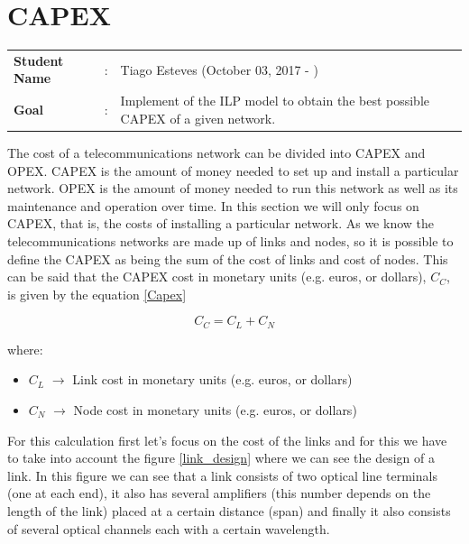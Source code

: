 \clearpage

\section{CAPEX}\label{ILP_CAPEX}
\begin{tcolorbox}	
\begin{tabular}{p{2.75cm} p{0.2cm} p{10.5cm}} 	
\textbf{Student Name}  &:& Tiago Esteves    (October 03, 2017 - )\\
\textbf{Goal}          &:& Implement of the ILP model to obtain the best possible CAPEX of a given network.
\end{tabular}
\end{tcolorbox}
\vspace{11pt}

The cost of a telecommunications network can be divided into CAPEX and OPEX.
CAPEX is the amount of money needed to set up and install a particular network.
OPEX is the amount of money needed to run this network as well as its maintenance and operation over time.
In this section we will only focus on CAPEX, that is, the costs of installing a particular network.
As we know the telecommunications networks are made up of links and nodes, so it is possible to define the CAPEX as being the sum of the cost of links and cost of nodes.
This can be said that the CAPEX cost in monetary units (e.g. euros, or dollars), $C_C$, is given by the equation \ref{Capex}

\begin{equation}
C_C = C_L + C_N
\label{Capex}
\end{equation}

where:
\begin{itemize}
\item{$C_L$				$\rightarrow$	Link cost in monetary units (e.g. euros, or dollars)}
\item{$C_N$				$\rightarrow$	Node cost in monetary units (e.g. euros, or dollars)}
\end{itemize}


\vspace{11pt}
For this calculation first let's focus on the cost of the links and for this we have to take into account the figure \ref{link_design} where we can see the design of a link. In this figure we can see that a link consists of two optical line terminals (one at each end), it also has several amplifiers (this number depends on the length of the link) placed at a certain distance (span) and finally it also consists of several optical channels each with a certain wavelength.

